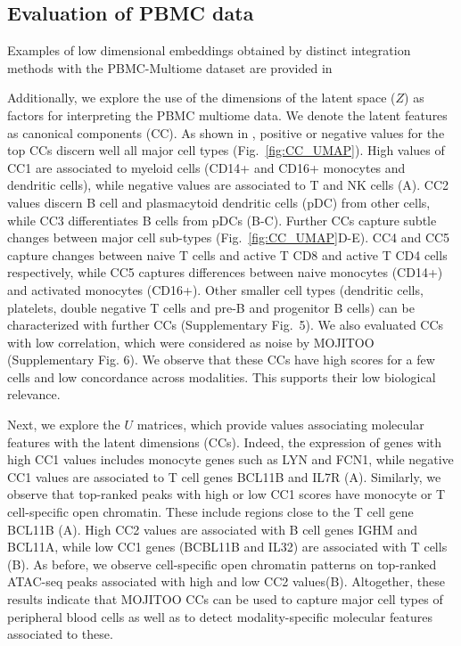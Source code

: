 \subsection{Evaluation of PBMC data}
Examples of low dimensional embeddings obtained by distinct integration methods with the PBMC-Multiome dataset are provided in 


Additionally, we explore the use of the dimensions of the latent space ($Z$) as factors for interpreting the PBMC multiome data. We denote the latent features as canonical components (CC). As shown in , positive or negative values for the top CCs discern well all major cell types (Fig.~\ref{fig:CC_UMAP}). High values of CC1 are associated to myeloid cells (CD14+ and CD16+ monocytes and dendritic cells), while negative values are associated to T and NK cells (A). CC2 values discern B cell and plasmacytoid dendritic cells (pDC) from other cells, while CC3 differentiates B cells from pDCs (B-C). Further CCs capture subtle changes between major cell sub-types (Fig.~\ref{fig:CC_UMAP}D-E). CC4 and CC5 capture changes between naive T cells and active T CD8 and active T CD4 cells respectively, while CC5 captures differences between naive monocytes (CD14+) and activated monocytes (CD16+). Other smaller cell types (dendritic cells, platelets, double negative T cells and pre-B and progenitor B cells) can be characterized with further CCs (Supplementary Fig.~5). We also evaluated CCs with low correlation, which were considered as noise by MOJITOO (Supplementary Fig. 6). We observe that these CCs have high scores for a few cells and low concordance across modalities. This supports their low biological relevance.


Next, we explore the $U$ matrices, which provide values associating molecular features with the latent dimensions (CCs). Indeed, the expression of genes with high CC1 values includes monocyte genes such as LYN and FCN1, while negative CC1 values are associated to T cell genes BCL11B and IL7R (A). Similarly, we observe that top-ranked peaks with high or low CC1 scores have monocyte or T cell-specific open chromatin. These include regions close to the T cell gene BCL11B (A). High CC2 values are associated with B cell genes IGHM and BCL11A, while low CC1 genes (BCBL11B and IL32) are associated with T cells (B). As before, we observe cell-specific open chromatin patterns on top-ranked ATAC-seq peaks associated with high and low CC2 values(B). Altogether, these results indicate that MOJITOO CCs can be used to capture major cell types of peripheral blood cells as well as to detect modality-specific molecular features associated to these.




